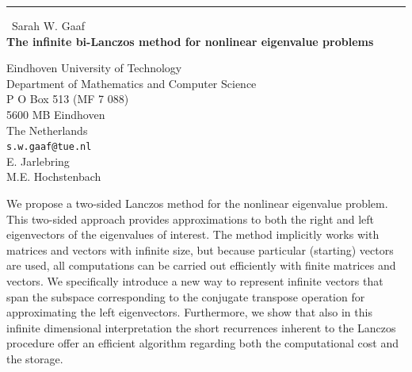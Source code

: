 \documentclass{report}
\begin{document}
\begin{center}
\rule{6in}{1pt} \
{\large Sarah W. Gaaf \\
{\bf The infinite bi-Lanczos method for nonlinear eigenvalue problems}}

Eindhoven University of Technology \\ Department of Mathematics and Computer Science \\ P O Box 513 (MF 7 088) \\ 5600 MB Eindhoven \\ The Netherlands
\\
{\tt s.w.gaaf@tue.nl}\\
E. Jarlebring\\
M.E. Hochstenbach\end{center}

We propose a two-sided Lanczos method for the nonlinear eigenvalue problem.
This two-sided approach provides approximations to both the right and
left eigenvectors of the eigenvalues of interest.
The method implicitly works with matrices and vectors with infinite size,
but because particular (starting) vectors are used, all computations can
be carried out efficiently with finite matrices and vectors.
We specifically introduce a new way to represent infinite vectors that
span the subspace corresponding to the conjugate transpose operation for
approximating the left eigenvectors.
Furthermore, we show that also in this infinite dimensional
interpretation the short recurrences inherent to the Lanczos procedure
offer an efficient algorithm regarding both the computational cost and
the storage.
\end{document}
